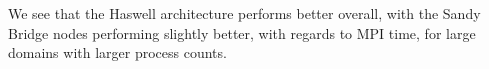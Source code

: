 \begin{enumerate}
We see that the Haswell architecture performs better overall, with the Sandy Bridge nodes performing slightly better, with regards to MPI time, for large domains with larger process counts.
\end{enumerate}

